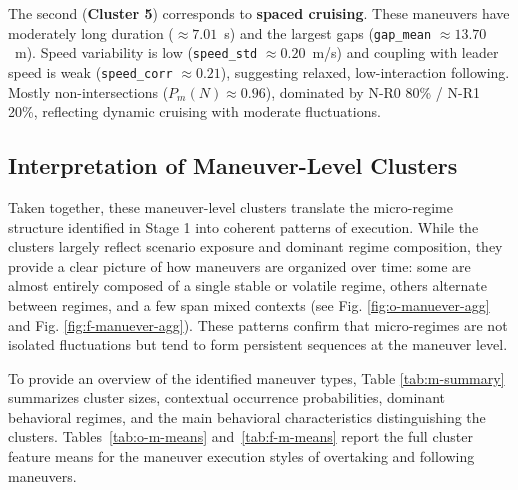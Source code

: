 The second (\textbf{Cluster 5}) corresponds to \textbf{spaced cruising}. These maneuvers have moderately long duration ($\approx 7.01$~s) and the largest gaps (\verb|gap_mean| $\approx 13.70$~m). Speed variability is low (\verb|speed_std| $\approx 0.20$~m/s) and coupling with leader speed is weak (\verb|speed_corr| $\approx 0.21$), suggesting relaxed, low-interaction following. Mostly non-intersections ($ P_m(N) \approx 0.96 $), dominated by N-R0 80\% / N-R1 20\%, reflecting dynamic cruising with moderate fluctuations.



\subsection{Interpretation of Maneuver-Level Clusters}
Taken together, these maneuver-level clusters translate the micro-regime structure identified in Stage 1 into coherent patterns of execution. While the clusters largely reflect scenario exposure and dominant regime composition, they provide a clear picture of how maneuvers are organized over time: some are almost entirely composed of a single stable or volatile regime, others alternate between regimes, and a few span mixed contexts (see Fig. \ref{fig:o-manuever-agg} and Fig. \ref{fig:f-manuever-agg}). These patterns confirm that micro-regimes are not isolated fluctuations but tend to form persistent sequences at the maneuver level.

To provide an overview of the identified maneuver types, Table \ref{tab:m-summary} summarizes cluster sizes, contextual occurrence probabilities, dominant behavioral regimes, and the main behavioral characteristics distinguishing the clusters. Tables~\ref{tab:o-m-means} and~\ref{tab:f-m-means} report the full cluster feature means for the maneuver execution styles of overtaking and following maneuvers.


